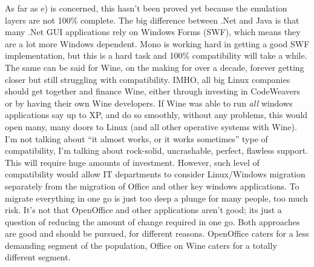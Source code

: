 \documentclass{memoir}
\begin{document}
As far as e) is concerned, this hasn't been proved yet because the
emulation layers are not 100\% complete. The big difference between
.Net and Java is that many .Net GUI applications rely on Windows Forms
(SWF), which means they are a lot more Windows dependent. Mono is
working hard in getting a good SWF implementation, but this is a hard
task and 100\% compatibility will take a while. The same can be said
for Wine, on the making for over a decade, forever getting closer but
still struggling with compatibility. IMHO, all big Linux companies
should get together and finance Wine, either through investing in
CodeWeavers or by having their own Wine developers. If Wine was able
to run \emph{all} windows applications say up to XP, and do so
smoothly, without any problems, this would open many, many doors to
Linux (and all other operative systems with Wine). I'm not talking
about ``it almost works, or it works sometimes'' type of compatibility,
I'm talking about rock-solid, uncrashable, perfect, flawless
support. This will require huge amounts of investment. However, such
level of compatibility would allow IT departments to consider
Linux/Windows migration separately from the migration of Office and
other key windows applications. To migrate everything in one go is
just too deep a plunge for many people, too much risk. It's not that
OpenOffice and other applications aren't good; its just a question of
reducing the amount of change required in one go. Both approaches are
good and should be pursued, for different reasons. OpenOffice caters
for a less demanding segment of the population, Office on Wine caters
for a totally different segment.
\end{document}
